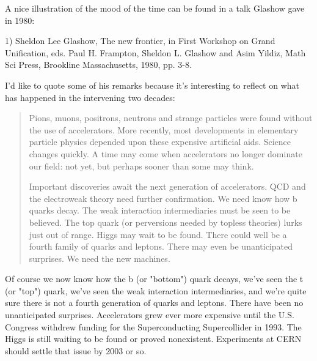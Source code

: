 A nice illustration of the mood of the time can be found in a talk
Glashow gave in 1980:

1) Sheldon Lee Glashow, The new frontier, in First Workshop on Grand
Unification, eds. Paul H. Frampton, Sheldon L. Glashow and Asim Yildiz,
Math Sci Press, Brookline Massachusetts, 1980, pp. 3-8.

I'd like to quote some of his remarks because it's interesting to
reflect on what has happened in the intervening two decades:

\begin{quote}
     Pions, muons, positrons, neutrons and strange particles were
     found without the use of accelerators.  More recently, most 
     developments in elementary particle physics depended upon these
     expensive artificial aids.  Science changes quickly.  A time may
     come when accelerators no longer dominate our field: not yet, but
     perhaps sooner than some may think.

     Important discoveries await the next generation of accelerators.
     QCD and the electroweak theory need further confirmation.  We need 
     know how b quarks decay.  The weak interaction intermediaries must
     be seen to be believed.  The top quark (or perversions needed by
     topless theories) lurks just out of range.  Higgs may wait to be 
     found.  There could well be a fourth family of quarks and leptons.
     There may even be unanticipated surprises.  We need the new machines.

\end{quote}
    

Of course we now know how the b (or "bottom") quark decays,
we've seen the t (or "top") quark, we've seen the weak
interaction intermediaries, and we're quite sure there is not a fourth
generation of quarks and leptons.  There have been no unanticipated
surprises.  Accelerators grew ever more expensive until the
U.S. Congress withdrew funding for the Superconducting Supercollider in
1993.  The Higgs is still waiting to be found or proved nonexistent.
Experiments at CERN should settle that issue by 2003 or so.

